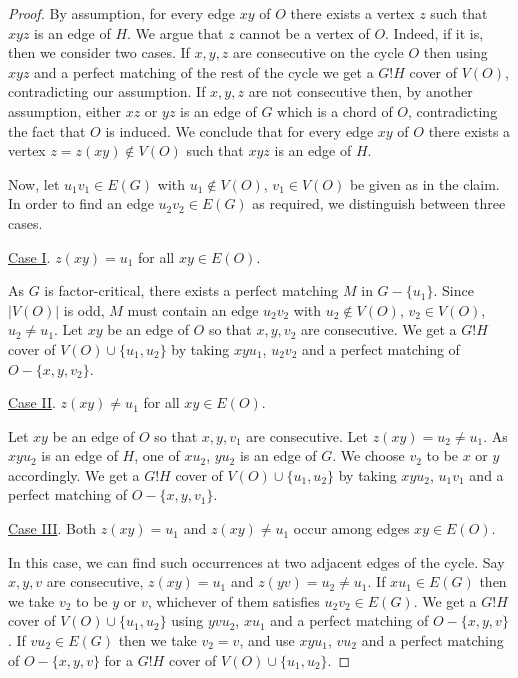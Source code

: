 \documentclass{article}
\theoremstyle{definition}
\begin{document}
\begin{proof} By assumption, for every edge $xy$ of $O$ there exists a vertex $z$ such that $xyz$ is an edge of $H$. We argue that $z$ cannot be a vertex of $O$. Indeed, if it is, then we consider two cases. If $x, y, z$ are consecutive on the cycle $O$ then using $xyz$ and a perfect matching of the rest of the cycle we get a $G!H$ cover of $V(O)$, contradicting our assumption. If $x, y, z$ are not consecutive then, by another assumption, either $xz$ or $yz$ is an edge of $G$ which is a chord of $O$, contradicting the fact that $O$ is induced. We conclude that for every edge $xy$ of $O$ there exists a vertex $z = z(xy) \notin V(O)$ such that $xyz$ is an edge of $H$.

Now, let $u_1v_1 \in E(G)$ with $u_1 \notin V(O)$, $v_1 \in V(O)$ be given as in the claim. In order to find an edge $u_2v_2 \in E(G)$ as required, we distinguish between three cases.

\vspace{5pt}

\noindent \underline{Case I}. $z(xy) = u_1$ for all $xy \in E(O)$.

As $G$ is factor-critical, there exists a perfect matching $M$ in $G - \{u_1\}$. Since $|V(O)|$ is odd, $M$ must contain an edge $u_2v_2$ with $u_2 \notin V(O)$, $v_2 \in V(O)$, $u_2 \ne u_1$. Let $xy$ be an edge of $O$ so that $x, y, v_2$ are consecutive. We get a $G!H$ cover of $V(O) \cup \{u_1,u_2\}$ by taking $xyu_1$, $u_2v_2$ and a perfect matching of $O - \{x, y, v_2\}$.

\vspace{5pt}

\noindent \underline{Case II}. $z(xy) \ne u_1$ for all $xy \in E(O)$.

Let $xy$ be an edge of $O$ so that $x, y, v_1$ are consecutive. Let $z(xy) = u_2 \ne u_1$. As $xyu_2$ is an edge of $H$, one of $xu_2$, $yu_2$ is an edge of $G$. We choose $v_2$ to be $x$ or $y$ accordingly. We get a $G!H$ cover of $V(O) \cup \{u_1, u_2\}$ by taking $xyu_2$, $u_1v_1$ and a perfect matching of $O - \{x, y, v_1\}$.

\vspace{5pt}

\noindent \underline{Case III}. Both $z(xy) = u_1$ and $z(xy) \ne u_1$ occur among edges $xy \in E(O)$.

In this case, we can find such occurrences at two adjacent edges of the cycle. Say $x, y, v$ are consecutive, $z(xy) = u_1$ and $z(yv) = u_2 \ne u_1$. If $xu_1 \in E(G)$ then we take $v_2$ to be $y$ or $v$, whichever of them satisfies $u_2v_2 \in E(G)$. We get a $G!H$ cover of $V(O) \cup \{u_1, u_2\}$ using $yvu_2$, $xu_1$ and a perfect matching of $O - \{x, y, v\}$. If $vu_2 \in E(G)$ then we take $v_2 = v$, and use $xyu_1$, $vu_2$ and a perfect matching of $O - \{x, y, v\}$ for a $G!H$ cover of $V(O) \cup \{u_1, u_2\}$.


\end{proof}
\end{document}
